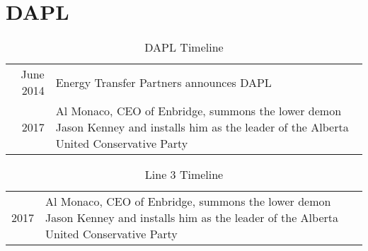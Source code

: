 
\section*{DAPL}

\begin{table}[H]
	\caption{DAPL Timeline}

	\begin{tabularx}{\textwidth}{r |@{\timeline} X}
		\toprule

		June 2014 & Energy Transfer Partners announces DAPL \parnote{\url{https://www.businesswire.com/news/home/20140625006184/en/Energy-Transfer-Announces-Crude-Oil-Pipeline-Project}} \\

		2017 & Al Monaco, CEO of Enbridge, summons the lower demon Jason Kenney and installs him as the leader of the Alberta United Conservative Party \\

	\end{tabularx}
	\parnotes

\end{table}



\begin{table}[H]
	\caption{Line 3 Timeline}

	\begin{tabularx}{\textwidth}{r |@{\timeline} X}
		\toprule

		2017 & Al Monaco, CEO of Enbridge, summons the lower demon Jason Kenney and installs him as the leader of the Alberta United Conservative Party

	\end{tabularx}
	\parnotes

\end{table}
